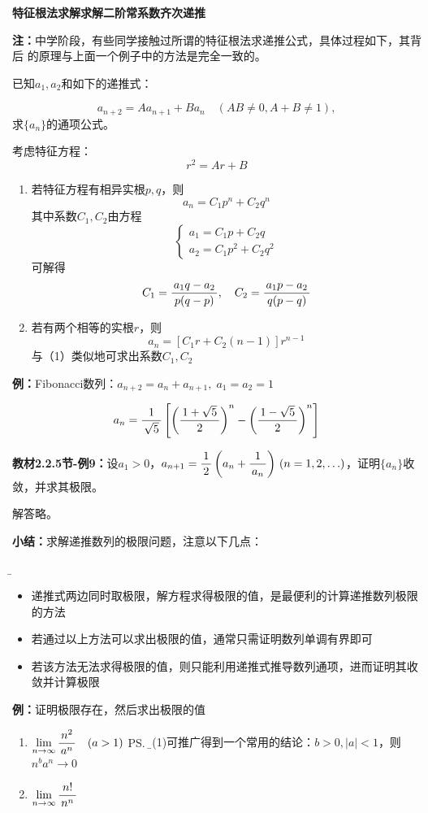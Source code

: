 \begin{shaded}
	{\bf 特征根法求解求解二阶常系数齐次递推}
	
	{\bf 注：}中学阶段，有些同学接触过所谓的特征根法求递推公式，具体过程如下，其背后
	的原理与上面一个例子中的方法是完全一致的。
	
	已知$a_1,a_2$和如下的递推式：
	
	$$a_{n+2}=Aa_{n+1}+Ba_n\quad (AB\ne 0, A+B\ne 1),$$
	求$\{a_n\}$的通项公式。
	
	考虑特征方程：
	$$r^2=Ar+B$$
	\begin{enumerate}[(1)]
	  \setlength{\itemindent}{1cm}
	  \item 若特征方程有相异实根$p,q$，则
	  $$a_n=C_1p^n+C_2q^n$$
	  其中系数$C_1,C_2$由方程
	  $$\left\{\begin{array}{l}
	  a_1=C_1p+C_2q\\
	  a_2=C_1p^2+C_2q^2
	  \end{array}\right.$$
	  可解得
	  $$C_1=\displaystyle\frac{\,{a_1q-a_2}\,}{\,{p(q-p)}\,},\quad 
	  C_2=\displaystyle\frac{\,{a_1p-a_2}\,}{\,{q(p-q)}\,}$$
	  \item 若有两个相等的实根$r$，则
	  $$a_n=[C_1r+C_2(n-1)]r^{n-1}$$
	  与（1）类似地可求出系数$C_1,C_2$
	\end{enumerate}
	
	{\bf 例：}Fibonacci数列：$a_{n+2}=a_n+a_{n+1},\;a_1=a_2=1$
	
	$$a_n=\displaystyle\frac{\,{1}\,}{\,{\sqrt5}\,}\left[\left(\displaystyle\frac{\,{1+\sqrt5}\,}{\,{2}\,}\right)^n
	-\left(\displaystyle\frac{\,{1-\sqrt5}\,}{\,{2}\,}\right)^n\right]$$
	
\end{shaded}

{\bf 教材2.2.5节-例9：}设$a_1>0$，$a_{n+1}=\displaystyle\frac{\,{1}\,}{\,{2}\,}\left(a_n+\displaystyle\frac{\,{1}\,}{\,{a_n}\,}\right)\,
(n=1,2,\ldots)$，证明$\{a_n\}$收敛，并求其极限。

解答略。

{\bf 小结：}求解递推数列的极限问题，注意以下几点：{\b
\begin{itemize}
  \setlength{\itemindent}{1cm}
  \item 递推式两边同时取极限，解方程求得极限的值，是最便利的计算递推数列极限的方法
  \item 若通过以上方法可以求出极限的值，通常只需证明数列单调有界即可
  \item 若该方法无法求得极限的值，则只能利用递推式推导数列通项，进而证明其收敛并计算极限
\end{itemize}}

{\bf 例：}证明极限存在，然后求出极限的值
\begin{enumerate}[(1)]
  \setlength{\itemindent}{1cm}
  \item $\lim\limits_{n\to\infty}\displaystyle\frac{\,{n^2}\,}{\,{a^n}\,}\quad (a>1)$%
  \ps{\b 由(1)可推广得到一个常用的结论：$b>0,|a|<1$，则$n^ba^n\to 0$}
  \item $\lim\limits_{n\to\infty}\displaystyle\frac{\,{n!}\,}{\,{n^n}\,}$%
\end{enumerate}

